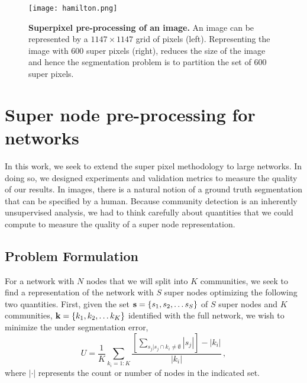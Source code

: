 \begin{figure}
\begin{center}
\texttt{[image: hamilton.png]}
\caption{{\bf Superpixel pre-processing of an image.} An image can be represented by a $1147 \times 1147$ grid of pixels (left). Representing the image with 600 super pixels (right), reduces the size of the image and hence the segmentation problem is to partition the set of 600 super pixels. }
\label{fig:superPix}
\end{center}
\end{figure}

\section{Super node pre-processing for networks}
In this work, we seek to extend the super pixel methodology to large networks. In doing so, we designed experiments and validation metrics to measure the quality of our results. In images, there is a natural notion of a ground truth segmentation that can be specified by a human. Because community detection is an inherently unsupervised analysis, we had to think carefully about quantities that we could compute to measure the quality of a super node representation.

\subsection{Problem Formulation}
For a network with $N$ nodes that we will split into $K$ communities, we seek to find a representation of the network with $S$ super nodes optimizing the following two quantities. First, given the set ${\bf s}=\{s_{1},s_{2},\dots s_{S}\}$ of $S$ super nodes and $K$ communities, ${\bf k}=\{k_{1},k_{2}, \dots k_{K}\}$ identified with the full network, we wish to minimize the under segmentation error, 
\begin{equation}
\label{UnderSeg}
U=\frac{1}{K}\sum_{k_{i}=1:K}\frac{[\sum_{s_{j}|s_{j}\cap k_{i}\ne \emptyset}|s_{j}|]-|k_{i}|}{|k_{i}|}\,,
\end{equation}
where $|\cdot|$ represents the count or number of nodes in the indicated set.

